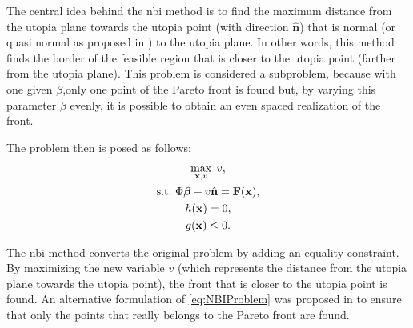 The central idea behind the \gls{nbi} method is to find the maximum distance from the utopia plane towards the utopia point (with direction $\hat{\mathbf{n}}$) that is normal (or quasi normal as proposed in \citet{Das1998}) to the utopia plane. In other words, this method finds the border of the feasible region that is closer to the utopia point (farther from the utopia plane). This problem is considered a subproblem, because with one given $\beta$,only one point of the Pareto front is found but, by varying this parameter $\beta$ evenly, it is possible to obtain an even spaced realization of the front.

The problem then is posed as follows:%
%
\begin{equation}
\begin{gathered}
\max_{\mathbf{x},v}{\;v}, \\
\text{s.t.} \ \Phi \boldsymbol{\beta} + v \hat{\mathbf{n}} = \mathbf{F}(\mathbf{x}),\\
h(\mathbf{x})=0, \\
g(\mathbf{x}) \leq 0.
\end{gathered}
\label{eq:NBIProblem}
\end{equation}%

The \gls{nbi} method converts the original problem by adding an equality constraint. By maximizing the new variable $v$ (which represents the distance from the utopia plane towards the utopia point), the front that is closer to the utopia point is found. An alternative formulation of \eqref{eq:NBIProblem} was proposed in \citet{Shukla2007} to ensure that only the points that really belongs to the Pareto front are found.

